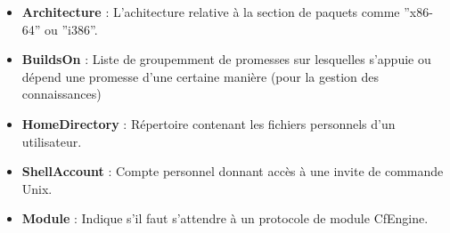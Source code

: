 \begin{itemize}
  \item \textbf{Architecture} : L'achitecture relative à la section de paquets
	  comme ''x86-64'' ou ''i386''.
  \item \textbf{BuildsOn} : Liste de groupemment de promesses sur lesquelles
	  s'appuie ou dépend une promesse d'une certaine manière (pour la
	  gestion des connaissances)
  \item \textbf{HomeDirectory} : Répertoire contenant les fichiers personnels
	  d'un utilisateur.
  \item \textbf{ShellAccount} : Compte personnel donnant accès à une invite de
	  commande Unix.
  \item \textbf{Module} : Indique s'il faut s'attendre à un protocole de module
	  CfEngine.
\end{itemize}

